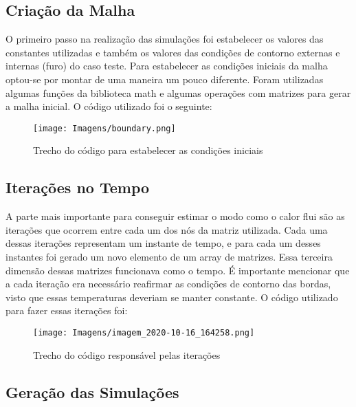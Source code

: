 \documentclass[article]{abntex2}
\begin{document}
\subsection{Criação da Malha}
O primeiro passo na realização das simulações foi estabelecer os valores das constantes utilizadas e também os valores das condições de contorno externas e internas (furo) do caso teste.
Para estabelecer as condições iniciais da malha optou-se por montar de uma maneira um pouco diferente. Foram utilizadas algumas funções da biblioteca math e algumas operações com matrizes para gerar a malha inicial. O código utilizado foi o seguinte:

\begin{figure}[H]
    \begin{center}
       
        \texttt{[image: Imagens/boundary.png]} 
        \caption{Trecho do código para estabelecer as condições iniciais}
    \end{center}
\end{figure}

\subsection{Iterações no Tempo}
A parte mais importante para conseguir estimar o modo como o calor flui são as iterações que ocorrem entre cada um dos nós da matriz utilizada. Cada uma dessas iterações representam um instante de tempo, e para cada um desses instantes foi gerado um novo elemento de um array de matrizes. Essa terceira dimensão dessas matrizes funcionava como o tempo. É importante mencionar que a cada iteração era necessário reafirmar as condições de contorno das bordas, visto que essas temperaturas deveriam se manter constante. O código utilizado para fazer essas iterações foi:

\begin{figure}[H]
    \begin{center}
       
        \texttt{[image: Imagens/imagem\_2020-10-16\_164258.png]} 
        \caption{Trecho do código responsável pelas iterações}
    \end{center}
\end{figure}



\subsection{Geração das Simulações}
\end{document}
